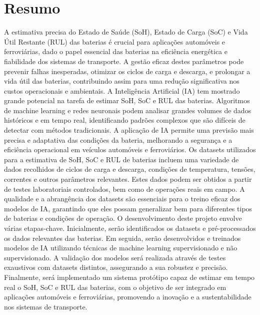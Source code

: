 

\renewcommand{\abstractname}{Resumo}
\markboth{\spacedlowsmallcaps{\abstractname}}{\spacedlowsmallcaps{\abstractname}}
\addcontentsline{toc}{chapter}{\abstractname}


\begingroup
\let\clearpage\relax
\let\cleardoublepage\relax

\chapter*{Resumo}
A estimativa precisa do Estado de Saúde (SoH), Estado de Carga (SoC) e Vida Útil Restante (RUL) das baterias é crucial para aplicações automóveis e ferroviárias, dado o papel essencial das baterias na eficiência energética e fiabilidade dos sistemas de transporte.
A gestão eficaz destes parâmetros pode prevenir falhas inesperadas, otimizar os ciclos de carga e descarga, e prolongar a vida útil das baterias, contribuindo assim para uma redução significativa nos custos operacionais e ambientais. 
A Inteligência Artificial (IA) tem mostrado grande potencial na tarefa de estimar SoH, SoC e RUL das baterias. Algoritmos de machine learning e redes neuronais podem analisar grandes volumes de dados históricos e em tempo real, identificando padrões complexos que são difíceis de detectar com métodos tradicionais. 
A aplicação de IA permite uma previsão mais precisa e adaptativa das condições da bateria, melhorando a segurança e a eficiência operacional em veículos automóveis e ferroviários. Os datasets utilizados para a estimativa de SoH, SoC e RUL de baterias incluem uma variedade de dados recolhidos de ciclos de carga e descarga, condições de temperatura, tensões, correntes e outros parâmetros relevantes. 
Estes dados podem ser obtidos a partir de testes laboratoriais controlados, bem como de operações reais em campo. A qualidade e a abrangência dos datasets são essenciais para o treino eficaz dos modelos de IA, garantindo que eles possam generalizar bem para diferentes tipos de baterias e condições de operação. O desenvolvimento deste projeto envolve várias etapas-chave. 
Inicialmente, serão identificados os datasets e pré-processados os dados relevantes das baterias. Em seguida, serão desenvolvidos e treinados modelos de IA utilizando técnicas de machine learning supervisionado e não supervisionado. A validação dos modelos será realizada através de testes exaustivos com datasets distintos, assegurando a sua robustez e precisão. 
Finalmente, será implementado um sistema protótipo capaz de estimar em tempo real o SoH, SoC e RUL das baterias, com o objetivo de ser integrado em aplicações automóveis e ferroviárias, promovendo a inovação e a sustentabilidade nos sistemas de transporte.\\



